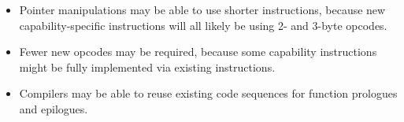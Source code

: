 \begin{itemize}
\item
Pointer manipulations may be able to use shorter instructions, because
new capability-specific instructions will all likely be using 2-
and 3-byte opcodes.
\item
Fewer new opcodes may be required, because some capability instructions
might be fully implemented via existing instructions.   
\item
Compilers may be able to reuse existing code sequences for function
prologues and epilogues.
\end{itemize}
